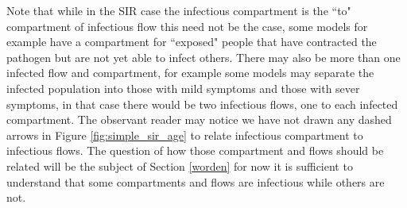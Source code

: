 Note that while in the SIR case the infectious compartment is the ``to" compartment of infectious flow this need not be the case, some models for example have a compartment for ``exposed" people that have contracted the pathogen but are not yet able to infect others. There may also be more than one infected flow and compartment, for example some models may separate the infected population into those with mild symptoms and those with sever symptoms, in that case there would be two infectious flows, one to each infected compartment. The observant reader may notice we have not drawn any dashed arrows in Figure \ref{fig:simple_sir_age} to relate infectious compartment to infectious flows. The question of how those compartment and flows should be related will be the subject of Section \ref{worden} for now it is sufficient to understand that some compartments and flows are infectious while others are not.

